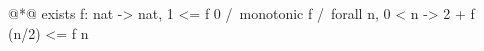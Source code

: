 \begin{minipage}{0.45\textwidth}
\vspace{0.3em}

\begin{adjustbox}{minipage={0.97\textwidth},fbox}
\vspace{-0.7em}
\begin{coql}
@*\grule*@
 exists f: nat -> nat,
   1 <= f 0 /\ monotonic f /\
   forall n, 0 < n -> 2 + f (n/2) <= f n
\end{coql}
\nointerlineskip%
\end{adjustbox}%
\end{minipage}
